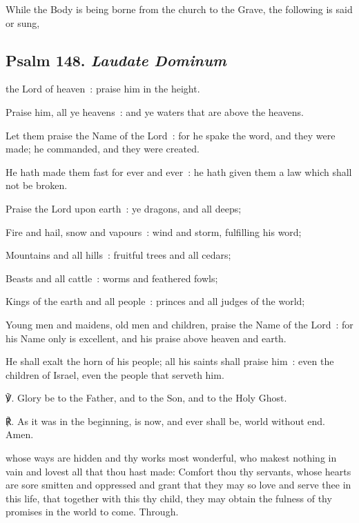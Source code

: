 
\begin{rubric}
    While the Body is being borne from the church to the Grave, the following is said or sung,
\end{rubric}

\subsection{Psalm 148. \textit{Laudate Dominum}}
 the Lord of heaven~: praise him in the height.\par
{}
Praise him, all ye heavens~: and ye waters that are above the heavens.\par
{}Let them praise the Name of the Lord~: for he spake the word, and they were made; he commanded, and they were created.\par
{}He hath made them fast for ever and ever~: he hath given them a law which shall not be broken.\par
{}Praise the Lord upon earth~: ye dragons, and all deeps;\par
{}Fire and hail, snow and vapours~: wind and storm, fulfilling his word;\par
{}Mountains and all hills~: fruitful trees and all cedars;\par
{}Beasts and all cattle~: worms and feathered fowls;\par
{}Kings of the earth and all people~: princes and all judges of the world;\par
{}Young men and maidens, old men and children, praise the Name of the Lord~: for his Name only is excellent, and his praise above heaven and earth.\par
{}He shall exalt the horn of his people; all his saints shall praise him~: even the children of Israel, even the people that serveth him.\par
℣. Glory be to the Father, and to the Son, and to the Holy Ghost.\par
℟. As it was in the beginning, is now, and ever shall be, world without end. Amen.

 whose ways are hidden and thy works most wonderful, who makest nothing in vain and lovest all that thou hast made: Comfort thou thy servants, whose hearts are sore smitten and oppressed and grant that they may so love and serve thee in this life, that together with this thy child, they may obtain the fulness of thy promises in the world to come. Through.

